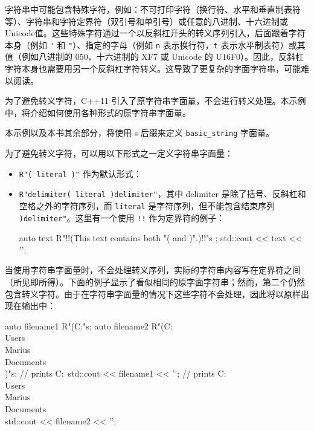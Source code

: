 
字符串中可能包含特殊字符，例如：不可打印字符（换行符、水平和垂直制表符等）、字符串和字符定界符（双引号和单引号）或任意的八进制、十六进制或Unicode值。这些特殊字符通过一个以反斜杠开头的转义序列引入，后面跟着字符本身（例如 \verb|'| 和 \verb|"|）、指定的字母（例如 \verb|n| 表示换行符，\verb|t| 表示水平制表符）或其值（例如八进制的 050、十六进制的 XF7 或 Unicode 的 U16F0）。因此，反斜杠字符本身也需要用另一个反斜杠字符转义。这导致了更复杂的字面字符串，可能难以阅读。

为了避免转义字符，C++11 引入了原字符串字面量，不会进行转义处理。本示例中，将介绍如何使用各种形式的原字符串字面量。


本示例以及本书其余部分，将使用 s 后缀来定义 \verb|basic_string| 字面量。


为了避免转义字符，可以用以下形式之一定义字符串字面量：

\begin{itemize}
\item
\verb|R"( literal )"| 作为默认形式：


\item
\verb|R"delimiter( literal )delimiter"|，其中 delimiter 是除了括号、反斜杠和空格之外的字符序列，而 \verb|literal| 是字符序列，但不能包含结束序列 \verb|)delimiter"|。这里有一个使用 \verb|!!| 作为定界符的例子：

\begin{cpp}
auto text{ R"!!(This text contains both "( and )".)!!"s };
std::cout << text << '\n';
\end{cpp}
\end{itemize}


当使用字符串字面量时，不会处理转义序列，实际的字符串内容写在定界符之间（所见即所得）。下面的例子显示了看似相同的原字面字符串；然而，第二个仍然包含转义字符。由于在字符串字面量的情况下这些字符不会处理，因此将以原样出现在输出中：

\begin{cpp}
auto filename1 {R"(C:\Users\Marius\Documents\)"s};
auto filename2 {R"(C:\\Users\\Marius\\Documents\\)"s};
// prints C:\Users\Marius\Documents\
std::cout << filename1 << '\n';
// prints C:\\Users\\Marius\\Documents\\
std::cout << filename2 << '\n';
\end{cpp}

